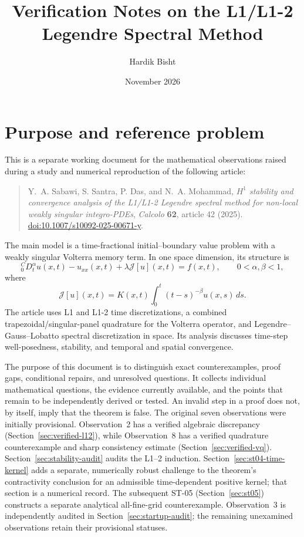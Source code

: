 \documentclass[11pt,a4paper]{amsart}
\title[Verification notes on a Legendre spectral method]{Verification Notes on the L1/L1-2\\Legendre Spectral Method}
\author{Hardik Bisht}
\date{November 2026}
\theoremstyle{remark}
\theoremstyle{plain}
\theoremstyle{remark}
\numberwithin{equation}{section}
\begin{document}
\maketitle

\section{Purpose and reference problem}

This is a separate working document for the mathematical observations raised during a study and numerical reproduction of the following article:
\begin{quote}
Y.~A. Sabawi, S. Santra, P. Das, and N.~A. Mohammad, 
\emph{$H^1$ stability and convergence analysis of the L1/L1-2 Legendre spectral method for non-local weakly singular integro-PDEs}, 
\emph{Calcolo} \textbf{62}, article 42 (2025). 
\href{https://doi.org/10.1007/s10092-025-00671-y}{doi:10.1007/s10092-025-00671-y}.
\end{quote}

The main model is a time-fractional initial--boundary value problem with a weakly singular Volterra memory term. In one space dimension, its structure is
\begin{equation}
 {}_0^CD_t^\alpha u(x,t)-u_{xx}(x,t)+\lambda\mathcal J[u](x,t)=f(x,t),
 \qquad 0<\alpha,\beta<1,
\end{equation}
where
\begin{equation}
 \mathcal J[u](x,t)=K(x,t)\int_0^t(t-s)^{-\beta}u(x,s)\,ds.
\end{equation}
The article uses L1 and L1-2 time discretizations, a combined trapezoidal/singular-panel quadrature for the Volterra operator, and Legendre--Gauss--Lobatto spectral discretization in space. Its analysis discusses time-step well-posedness, stability, and temporal and spatial convergence.

The purpose of this document is to distinguish exact counterexamples, proof gaps, conditional repairs, and unresolved questions. It collects individual mathematical questions, the evidence currently available, and the points that remain to be independently derived or tested. An invalid step in a proof does not, by itself, imply that the theorem is false. The original seven observations were initially provisional. Observation~2 has a verified algebraic discrepancy (Section~\ref{sec:verified-l12}), while Observation~8 has a verified quadrature counterexample and sharp consistency estimate (Section~\ref{sec:verified-vq}). Section~\ref{sec:stability-audit} audits the L1--2 induction. Section~\ref{sec:st04-time-kernel} adds a separate, numerically robust challenge to the theorem's contractivity conclusion for an admissible time-dependent positive kernel; that section is a numerical record. The subsequent ST-05 (Section~\ref{sec:st05}) constructs a separate analytical all-fine-grid counterexample. Observation~3 is independently audited in Section~\ref{sec:startup-audit}; the remaining unexamined observations retain their provisional statuses.
\end{document}
